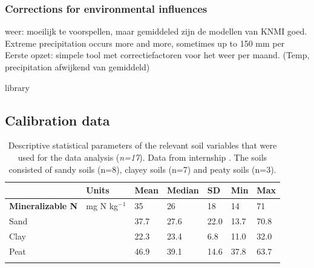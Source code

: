 \documentclass[10pt,twoside,dutch,english]{report}
\begin{document}
    \subsection{Corrections for environmental influences}
	weer: moeilijk te voorspellen, maar gemiddeled zijn de modellen van KNMI goed. Extreme precipitation occurs more and more, sometimes up to 150 mm per
    Eerste opzet: simpele tool met correctiefactoren voor het weer per maand. (Temp, precipitation afwijkend van gemiddeld)



\linespread{1.0}
\footnotesize 
{}

 {library}
\normalsize 
\linespread{1.3}




\begin{appendices}
\makeatletter
{}
\makeatother

\chapter{Calibration data}
	\label{chap: Calibration data}


	\small 
			\begin{longtabu} to \textwidth{X[1.6,l]X[1,l]X[1,r]X[1,r]X[1,r]X[1,r]X[1,r]}
           \caption{Descriptive statistical parameters of the relevant soil variables that were used for the data analysis (\textit{n=17}). Data from internship \cite{Echeverri2014}. The soils consisted of sandy soils (n=8), clayey soils (n=7) and peaty soils (n=3).} \label{tab: results_char} \\
            	

			\toprule \rowfont{\bfseries}
			& Units & Mean & Median & SD & Min & Max \\ \midrule 
            \endhead
          

		\textbf{Mineralizable N }& mg N kg$ ^{-1} $ & 35 & 26 & 18 & 14 & 71 \\  
         \quad Sand &  & 37.7 & 27.6 & 22.0 & 13.7 & 70.8 \\ 
          \quad Clay&  & 22.3 & 23.4 & 6.8 & 11.0 & 32.0 \\ 
          \quad Peat & & 46.9 & 39.1 & 14.6 & 37.8 & 63.7 \\  \\
       

\end{longtabu}
\end{appendices}
\end{document}
